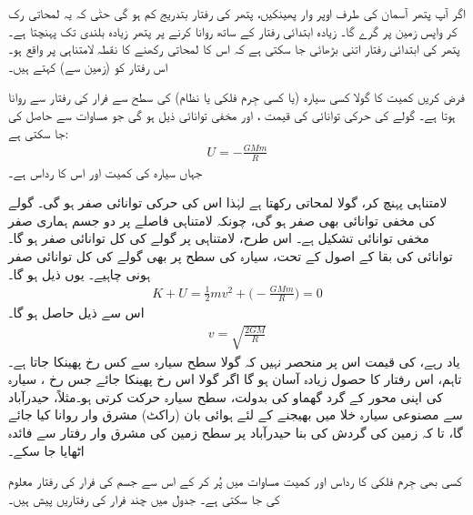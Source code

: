 اگر آپ پتھر آسمان کی طرف  اوپر وار پھینکیں،   پتھر  کی رفتار بتدریج کم ہو گی حتٰی کہ یہ لمحاتی رک کر واپس زمین پر گرے گا۔ زیادہ ابتدائی رفتار کے ساتھ روانا کرنے پر پتھر زیادہ بلندی تک پہنچتا ہے۔ پتھر کی ابتدائی رفتار اتنی بڑھائی جا سکتی ہے کہ  اس کا لمحاتی رکھنے کا نقطہ لامتناہی پر واقع ہو۔ اس رفتار کو  (زمین سے)   کہتے ہیں۔

فرض کریں کمیت  کا گولا  کسی سیارہ   (یا کسی جِرم فلکی  یا نظام)  کی سطح  سے فرار کی رفتار  سے روانا ہوتا ہے۔ گولے کی حرکی توانائی  کی قیمت  ، اور مخفی توانائی  ذیل  ہو گی جو مساوات  سے حاصل کی جا سکتی ہے:
\begin{align*}
U=-\frac{GMm}{R}
\end{align*}
جہاں سیارہ کی کمیت  اور اس کا رداس  ہے۔

لامتناہی پہنچ کر، گولا لمحاتی رکھتا ہے لہٰذا اس کی حرکی توانائی صفر ہو گی۔ گولے کی مخفی توانائی بھی صفر ہو گی، چونکہ لامتناہی فاصلے پر دو جسم ہماری صفر مخفی توانائی تشکیل ہے۔ اس طرح، لامتناہی پر گولے کی کل  توانائی صفر ہو گا۔ توانائی کی بقا کے اصول کے تحت، سیارہ کی سطح پر بھی گولے کی کل توانائی صفر ہونی چاہیے۔ یوں ذیل ہو گا۔
\begin{align*}
K+U=\frac{1}{2}mv^2+\big(-\frac{GMm}{R}\big)=0
\end{align*}
اس سے ذیل حاصل ہو گا۔
\begin{align}\label{مساوات_تجاذب_رفتار_فرار}
v=\sqrt{\frac{2GM}{R}}
\end{align}
یاد رہے،  کی قیمت اس پر منحصر نہیں کہ گولا سطح سیارہ سے کس رخ پھینکا جاتا ہے۔تاہم، اس رفتار  کا حصول زیادہ آسان ہو گا اگر گولا اس رخ پھینکا جائے جس رخ ، سیارہ کی اپنی محور کے  گرد گھماو کی بدولت، سطح  سیارہ  حرکت کرتی  ہو۔مثلاً، حیدرآباد  سے مصنوعی سیارہ   خلا میں بھیجنے کے لئے   ہوائی بان (راکٹ) مشرق  وار روانا کیا جائے گا، تا کہ   زمین کی گردش  کی بنا حیدرآباد  پر سطح زمین کی  مشرق وار رفتار سے فائدہ اٹھایا جا سکے۔

کسی بھی  جِرم فلکی کا رداس  اور کمیت   مساوات  میں پُر کر کے اس سے جسم کی فرار کی رفتار معلوم کی جا سکتی ہے۔ جدول  میں چند فرار کی  رفتاریں پیش ہیں۔

